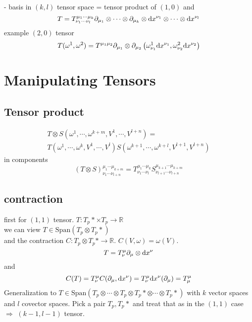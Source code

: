 
- basis in $(k,l)$ tensor space = tensor product of $(1,0)$ and
$$
T = T^{\mu_1\cdots\mu_k}_{\nu_1\cdots\nu_l} \partial_{\mu_1}\otimes\cdots\otimes\partial_{\mu_k}\otimes\text dx^{\nu_1}\otimes\cdots\otimes\text dx^{\nu_l}
$$
example $(2,0)$ tensor
$$
T(\omega^1, \omega^2) = T^{\mu_1\mu_2}\partial_{\mu_1}\otimes \partial_{\mu_2}\left(\omega_{\nu_1}^1 \text dx^{\nu_1}, \omega^2_{\nu_2}\text dx^{\nu_2}\right)
$$

\section{Manipulating Tensors}

\subsection{Tensor product}

\begin{gather}
	T\otimes S(\omega^1, \cdots, \omega^{k+m},V^{1}, \cdots, V^{l+n}) =\\
	T(\omega^1,\cdots,\omega^k,V^1,\cdots, V^l) S(\omega^{k+1}, \cdots,\omega^{k+l},V^{l+1},V^{l+n})
\end{gather}
in components
$$
\left(T\otimes S\right)^{\mu_1\cdots\mu_{k+m}}_{\nu_1\cdots\nu_{l+n}} = T^{\mu_1\cdots\mu_k}_{\nu_1\cdots\nu_l}S^{\mu_{k+1}\cdots\mu_{k+m}}_{\nu_{l+1}\cdots\nu_{l+n}}
$$
\subsection{contraction}
first for $(1,1)$ tensor. $T:T_p* \times T_p\rightarrow \mathbb R$\\
we can view $T\in \text{Span}(T_p\otimes T_p*)$\\
and the contraction $C: T_p\otimes T_p*\rightarrow \mathbb R$. $C(V,\omega) = \omega(V).$
$$
T = T^\mu_\nu \partial_\mu \otimes \text dx^\nu
$$
and
$$
C(T) = T^\mu_\nu C(\partial_\mu,\text dx^\nu) = T^\mu_\nu \text dx^\nu(\partial_\mu) = T^\mu_\mu
$$
Generalization to $T\in\text{Span}(T_p\otimes\cdots\otimes T_p\otimes T_p*\otimes\cdots\otimes T_p*)$ with $k$ vector spaces and $l$ covector spaces. Pick a pair $T_p, T_p*$ and treat that as in the $(1,1)$ case $\Rightarrow$ $(k-1,l-1)$ tensor.






